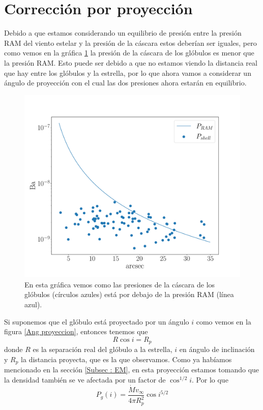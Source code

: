 \documentclass{book}
\begin{document}
\section{Corrección por proyección}\label{Sec:proyeccion}

Debido a que estamos considerando un equilibrio de presión entre la presión RAM del viento estelar y la presión de la cáscara estos deberían ser iguales, pero como vemos en la gráfica \ref{graf_presion} la presión de la cáscara de los glóbulos es menor que la presión RAM. Esto puede ser debido a que no estamos viendo la distancia real que hay entre los glóbulos y la estrella, por lo que ahora vamos a considerar un ángulo de proyección con el cual las dos presiones ahora estarán en equilibrio.

\begin{figure}[h]
    \centering
    \includegraphics[width=\textwidth]{imagenes Chapter 4/Presiones.pdf}
    \caption{En esta gráfica vemos como las presiones de la cáscara de los glóbulos (círculos azules) está por debajo de la presión RAM (línea azul).}
    \label{graf_presion}
\end{figure}

Si suponemos que el glóbulo está proyectado por un ángulo $i$ como vemos en la figura \ref{Ang proyeccion}, entonces tenemos que \[R\cos i=R_p\] donde $R$ es la separación real del glóbulo a la estrella, $i$ en ángulo de inclinación y $R_p$ la distancia proyecta, que es la que observamos. Como ya habíamos mencionado en la sección \ref{Subsec : EM}, en esta proyección estamos tomando que la densidad también se ve afectada por un factor de $\cos^{1/2}i$.  Por lo que \[P_{g}(i)=\frac{\dot{M}v_\infty}{4\pi R_p^2}\cos{i}^{5/2}\]
\end{document}

